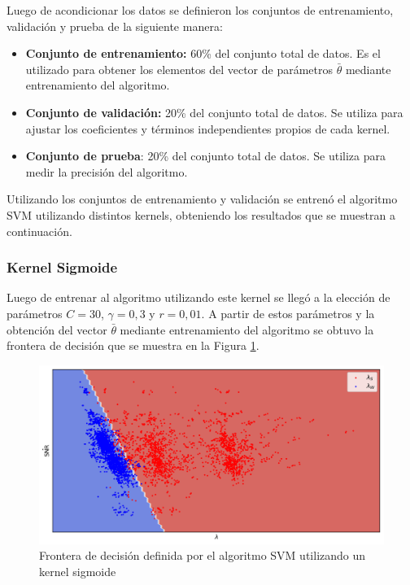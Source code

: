 Luego de acondicionar los datos se definieron los conjuntos de entrenamiento, validación y prueba de la siguiente manera:
\begin{itemize}
  \item \textbf{Conjunto de entrenamiento:} 60\% del conjunto total de datos. Es el utilizado para obtener los elementos del vector de parámetros $\bar{\theta}$ mediante entrenamiento del algoritmo.
  \item \textbf{Conjunto de validación:} 20\% del conjunto total de datos. Se utiliza para ajustar los coeficientes y términos independientes propios de cada kernel.
  \item \textbf{Conjunto de prueba}: 20\% del conjunto total de datos. Se utiliza para medir la precisión del algoritmo.
\end{itemize}

Utilizando los conjuntos de entrenamiento y validación se entrenó el algoritmo SVM utilizando distintos kernels, obteniendo los resultados que se muestran a continuación.

\subsubsection{Kernel Sigmoide}

Luego de entrenar al algoritmo utilizando este kernel se llegó a la elección de parámetros $C=30$, $\gamma=0,3$ y $r=0,01$. A partir de estos parámetros y la obtención del vector $\bar{\theta}$ mediante entrenamiento del algoritmo se obtuvo la frontera de decisión que se muestra en la Figura \ref{fig:ml_svm_sigmoid}.

\begin{figure}[ht!]
  \centering
  \includegraphics[width=0.9\linewidth]{images/05-Machine Learning/ml_svm_sigmoid.png}
  \caption{Frontera de decisión definida por el algoritmo SVM utilizando un kernel sigmoide}
  \label{fig:ml_svm_sigmoid}
\end{figure}

